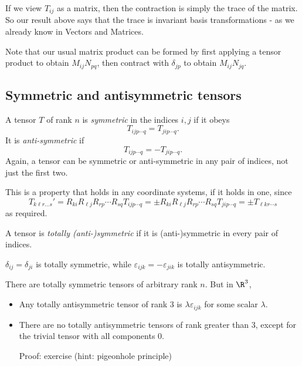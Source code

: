 \documentclass[a4paper]{article}
\begin{document}
If we view $T_{ij}$ as a matrix, then the contraction is simply the trace of the matrix. So our result above says that the trace is invariant basis transformations - as we already know in Vectors and Matrices.

Note that our usual matrix product can be formed by first applying a tensor product to obtain $M_{ij}N_{pq}$, then contract with $\delta_{jp}$ to obtain $M_{ij}N_{jq}$.
\subsection{Symmetric and antisymmetric tensors}
\begin{defi}
  A tensor $T$ of rank $n$ is \emph{symmetric} in the indices $i,j$ if it obeys
  \[
    T_{ijp\cdots q} = T_{jip\cdots q}.
  \]
  It is \emph{anti-symmetric} if
  \[
    T_{ijp\cdots q} = -T_{jip\cdots q}.
  \]
  Again, a tensor can be symmetric or anti-symmetric in any pair of indices, not just the first two.
\end{defi}

This is a property that holds in any coordinate systems, if it holds in one, since
\[
  T_{k\ell r\ldots s}' = R_{ki}R_{\ell j}R_{rp}\cdots R_{sq}T_{ijp\cdots q} = \pm R_{ki} R_{\ell j} R_{rp}\cdots R_{sq}T_{jip\cdots q} = \pm T_{\ell kr\cdots s}
\]
as required.

\begin{defi}
  A tensor is \emph{totally (anti-)symmetric} if it is (anti-)symmetric in every pair of indices.
\end{defi}

\begin{eg}
  $\delta_{ij} = \delta_{ji}$ is totally symmetric, while $\varepsilon_{ijk} = -\varepsilon_{jik}$ is totally antisymmetric.

  There are totally symmetric tensors of arbitrary rank $n$. But in $\R^3$,
  \begin{itemize}
    \item Any totally antisymmetric tensor of rank 3 is $\lambda \varepsilon_{ijk}$ for some scalar $\lambda$.
    \item There are no totally antisymmetric tensors of rank greater than $3$, except for the trivial tensor with all components $0$.

      Proof: exercise (hint: pigeonhole principle)
  \end{itemize}
\end{eg}
\end{document}
